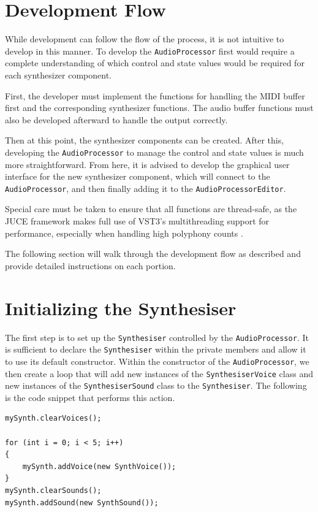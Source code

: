 \documentclass[a4paper,12pt]{report}
\begin{document}
\section{Development Flow}
\label{sec:devflow}
While development can follow the flow of the process, it is not intuitive to develop in this manner. To develop the \texttt{Audio\-Processor} first would require a complete understanding of which control and state values would be required for each synthesizer component.

First, the developer must implement the functions for handling the MIDI buffer first and the corresponding synthesizer functions. The audio buffer functions must also be developed afterward to handle the output correctly.

Then at this point, the synthesizer components can be created. After this, developing the \texttt{Audio\-Processor} to manage the control and state values is much more straightforward. From here, it is advised to develop the graphical user interface for the new synthesizer component, which will connect to the \texttt{Audio\-Processor}, and then finally adding it to the \texttt{Audio\-Processor\-Editor}.

Special care must be taken to ensure that all functions are thread-safe, as the JUCE framework makes full use of VST3's multithreading support for performance, especially when handling high polyphony counts \cite{juceclassindex}.

The following section will walk through the development flow as described and provide detailed instructions on each portion.

\section{Initializing the Synthesiser}
\label{sec:initializesynthesizer}
The first step is to set up the \texttt{Synthesiser} controlled by the \texttt{Audio\-Processor}. It is sufficient to declare the \texttt{Synthesiser} within the private members and allow it to use its default constructor. 
Within the constructor of the \texttt{Audio\-Processor}, we then create a loop that will add new instances of the \texttt{Synthesiser\-Voice} class and new instances of the \texttt{Synthesiser\-Sound} class to the \texttt{Synthesiser}. The following is the code snippet that performs this action.

 \noindent\begin{minipage}{\linewidth} \begin{lstlisting}[caption={Instantiating Voices},label={code:instantiatingvoices},captionpos=b]
mySynth.clearVoices();
    
for (int i = 0; i < 5; i++)
{
    mySynth.addVoice(new SynthVoice());
}
mySynth.clearSounds();
mySynth.addSound(new SynthSound());
\end{lstlisting}
\end{minipage}
\end{document}
